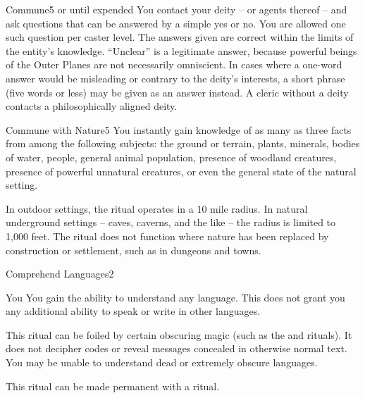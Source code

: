 \begin{spellsection}{Commune}{5}
\spelldur \durmed or until expended
\spellline
\spelleffect You contact your deity -- or agents thereof -- and ask questions that can be answered by a simple yes or no. You are allowed one such question per caster level. The answers given are correct within the limits of the entity's knowledge. ``Unclear'' is a legitimate answer, because powerful beings of the Outer Planes are not necessarily omniscient. In cases where a one-word answer would be misleading or contrary to the deity's interests, a short phrase (five words or less) may be given as an answer instead.
\spellnotes A cleric without a deity contacts a philosophically aligned deity.
\end{spellsection}

\begin{spellsection}{Commune with Nature}{5}
\spellline
\spelleffect You instantly gain knowledge of as many as three facts from among the following subjects: the ground or terrain, plants, minerals, bodies of water, people, general animal population, presence of woodland creatures, presence of powerful unnatural creatures, or even the general state of the natural setting.
\par In outdoor settings, the ritual operates in a 10 mile radius. In natural underground settings -- caves, caverns, and the like -- the radius is limited to 1,000 feet.
\spellnotes The ritual does not function where nature has been replaced by construction or settlement, such as in dungeons and towns.
\end{spellsection}

\begin{spellsection}{Comprehend Languages}{2}
\spelldur \durlong
{}
\begin{spelltarget}{You}
    \spelleffect You gain the ability to understand any language. This does not grant you any additional ability to speak or write in other languages.
\end{spelltarget}
\spellnotes This ritual can be foiled by certain obscuring magic (such as the  and  rituals). It does not decipher codes or reveal messages concealed in otherwise normal text. You may be unable to understand dead or extremely obscure languages.

This ritual can be made permanent with a  ritual.
\end{spellsection}

